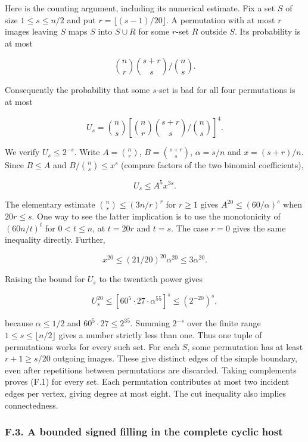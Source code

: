 \documentclass[english,11pt,a4paper]{article}
\begin{document}
Here is the counting argument, including its numerical estimate. Fix a set \(S\) of size \(1\le s\le n/2\) and put \(r=\lfloor (s-1)/20\rfloor\). A permutation with at most \(r\) images leaving \(S\) maps \(S\) into \(S\cup R\) for some \(r\)-set \(R\) outside \(S\). Its probability is at most

\[\binom nr\binom{s+r}s\big/\binom ns.\]

Consequently the probability that some \(s\)-set is bad for all four permutations is at most

\[U_s=\binom ns\left[\binom nr\binom{s+r}s\big/\binom ns\right]^4.\]

We verify \(U_{s}\le 2^{-s}\). Write \(A=\binom{n}{r}\), \(B=\binom{s+r}{s}\), \(\alpha=s/n\) and \(x=(s+r)/n\). Since \(B\le A\) and \(B/\binom{n}{s}\le x^{s}\) (compare factors of the two binomial coefficients),

\[U_s\le A^5x^{3s}.\]

The elementary estimate \(\binom{n}{r}\le (3n/r)^{r}\) for \(r\ge 1\) gives \(A^{20}\le (60/\alpha)^{s}\) when \(20r\le s\). One way to see the latter implication is to use the monotonicity of \((60n/t)^{t}\) for \(0<t\le n\), at \(t=20r\) and \(t=s\). The case \(r=0\) gives the same inequality directly. Further,

\[x^{20}\le(21/20)^{20}\alpha^{20}\le3\alpha^{20}.\]

Raising the bound for \(U_{s}\) to the twentieth power gives

\[U_s^{20}\le[60^5\cdot27\cdot\alpha^{55}]^s\le(2^{-20})^s,\]

because \(\alpha\le 1/2\) and \(60^{5}\cdot 27\le 2^{35}\). Summing \(2^{-s}\) over the finite range \(1\le s\le \lfloor n/2\rfloor\) gives a number strictly less than one. Thus one tuple of permutations works for every such set. For each \(S\), some permutation has at least \(r+1\ge s/20\) outgoing images. These give distinct edges of the simple boundary, even after repetitions between permutations are discarded. Taking complements proves (F.1) for every set. Each permutation contributes at most two incident edges per vertex, giving degree at most eight. The cut inequality also implies connectedness.

\subsubsection{F.3. A bounded signed filling in the complete cyclic host}\label{f.3.-a-bounded-signed-filling-in-the-complete-cyclic-host}
\end{document}

